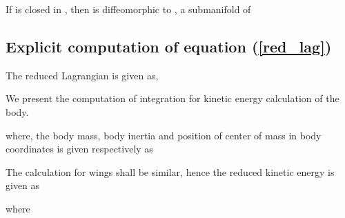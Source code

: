 \documentclass[letterpaper, 10 pt, conference]{ieeeconf}  \newcommand{\RN}[1]{\textup{\uppercase\expandafter{\romannumeral#1}}}
\begin{document}
If  is closed in , then  is diffeomorphic to , a submanifold of 

\subsection{Explicit computation of equation (\ref{red_lag}) }\label{KE computation}
The reduced Lagrangian is given as,

We present the computation of integration for kinetic energy calculation of the body. 

where, the body mass, body inertia and position of center of mass in body coordinates is given respectively as

The calculation for wings shall be similar, hence the reduced kinetic energy is given as

where 
\end{document}
